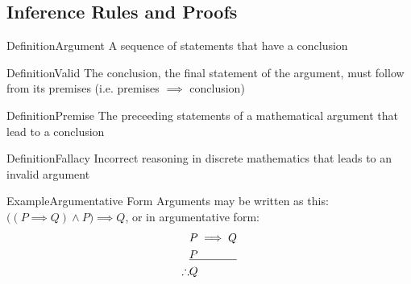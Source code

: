 \documentclass{MathNotes}
\newenvironment{example}[1]{\begin{BlueBox}{Example}{#1}}{\end{BlueBox}}
\newenvironment{definition}[1]{\begin{RedBox}{Definition}{#1}}{\end{RedBox}}
\begin{document}
\subsection{Inference Rules and Proofs}
\begin{multicols}{2}
	\begin{definition}{Argument}\label{def:argument}
		A sequence of statements that have a conclusion
	\end{definition}

	\begin{definition}{Valid}\label{def:valid}
		The conclusion, the final statement of the argument, must follow from its premises
		\newline
		(i.e. premises $\implies$ conclusion)
	\end{definition}

	\begin{definition}{Premise}\label{def:premise}
		The preceeding statements of a mathematical argument that lead to a conclusion
	\end{definition}

	\begin{definition}{Fallacy}
		Incorrect reasoning in discrete mathematics that leads to an invalid argument
	\end{definition}
\end{multicols}


\begin{example}{Argumentative Form}\label{ex:argumentative-form}
	Arguments may be written as this: $\big((P\implies Q)\land P\big)\implies Q$, or in argumentative form:
	\begin{align*}
		           & P\implies Q                 \\
		           & \underline{P\hspace{3.5em}} \\
		\therefore & Q
	\end{align*}
\end{example}
\end{document}

